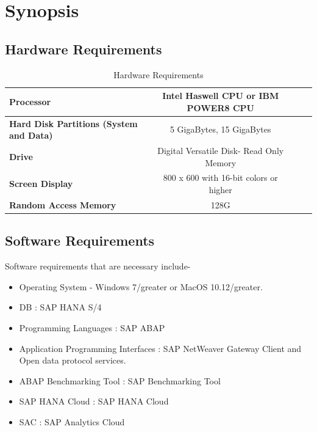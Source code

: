 \chapter{Synopsis}
\section{Hardware Requirements}


\begin{table}[H]
    \fontsize{10}{12}\selectfont
    \caption{Hardware Requirements}
    \label{c1:hardware_requirements}
    \begin{center}
    \begin{tabular}{|p{7cm}|c|c|c|}
        \hline
        \textbf{Processor }& Intel Haswell CPU or IBM POWER8 CPU \\ \hline
        \textbf{Hard Disk Partitions (System and Data)}    &   5 GigaBytes, 15 GigaBytes       \\\hline
        \textbf{Drive}    &   Digital Versatile Disk- Read Only Memory         \\\hline
        \textbf{Screen Display}    &   800 x 600 with 16-bit colors or higher  \\\hline
        \textbf{Random Access Memory}    &   128G \\\hline

    \end{tabular}
    \end{center}
    \end{table}
    
\section{Software Requirements}
Software requirements that are necessary include-
\begin{itemize}
    \item Operating System - Windows 7/greater or MacOS 10.12/greater.
    \item DB : SAP HANA S/4
    \item Programming Languages : SAP ABAP
    \item Application Programming Interfaces : SAP NetWeaver Gateway Client and Open data protocol services.
    \item ABAP Benchmarking Tool : SAP Benchmarking Tool
    \item SAP HANA Cloud : SAP HANA Cloud
    \item SAC : SAP Analytics Cloud
    
\end{itemize}


